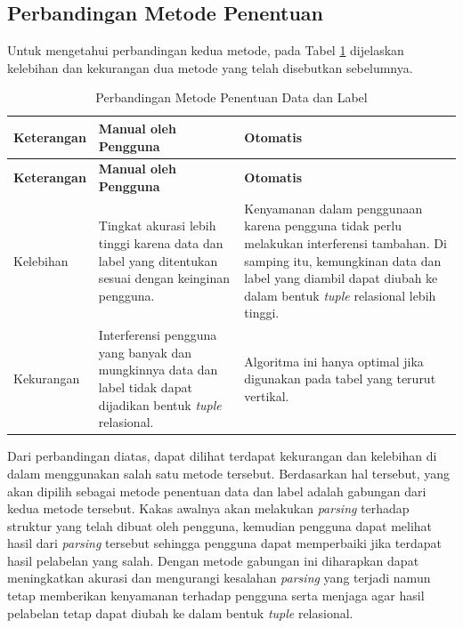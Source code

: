 	\subsection{Perbandingan Metode Penentuan}
	Untuk mengetahui perbandingan kedua metode, pada Tabel \ref{MetodePenentuan} dijelaskan kelebihan dan kekurangan dua metode yang telah disebutkan sebelumnya.
	\begin{small}
	\begin{longtable}{ | p{3cm} | p{4cm} | p{4cm} | }
	    \caption{Perbandingan Metode Penentuan Data dan Label}
	    \label{MetodePenentuan}\\ \hline
	    \centering\bfseries{Keterangan} & \centering\bfseries{Manual oleh Pengguna} & \centering\bfseries{Otomatis} \tabularnewline \hline
	    \endfirsthead
	    \hline
	    \centering\bfseries{Keterangan} & \centering\bfseries{Manual oleh Pengguna} & \centering\bfseries{Otomatis} \tabularnewline \hline
	    \endhead
	    Kelebihan & Tingkat akurasi lebih tinggi karena data dan label yang ditentukan sesuai dengan keinginan pengguna. & Kenyamanan dalam penggunaan karena pengguna tidak perlu melakukan interferensi tambahan. Di samping itu, kemungkinan data dan label yang diambil dapat diubah ke dalam bentuk \textit{tuple} relasional lebih tinggi. \\ \hline
	    Kekurangan & Interferensi pengguna yang banyak dan mungkinnya data dan label tidak dapat dijadikan bentuk \textit{tuple} relasional. & Algoritma ini hanya optimal jika digunakan pada tabel yang terurut vertikal. \\ \hline
  	\end{longtable}
	\end{small}
  	Dari perbandingan diatas, dapat dilihat terdapat kekurangan dan kelebihan di dalam menggunakan salah satu metode tersebut. Berdasarkan hal tersebut, yang akan dipilih sebagai metode penentuan data dan label adalah gabungan dari kedua metode tersebut. Kakas awalnya akan melakukan \textit{parsing} terhadap struktur yang telah dibuat oleh pengguna, kemudian pengguna dapat melihat hasil dari \textit{parsing} tersebut sehingga pengguna dapat memperbaiki jika terdapat hasil pelabelan yang salah. Dengan metode gabungan ini diharapkan dapat meningkatkan akurasi dan mengurangi kesalahan \textit{parsing} yang terjadi namun tetap memberikan kenyamanan terhadap pengguna serta menjaga agar hasil pelabelan tetap dapat diubah ke dalam bentuk \textit{tuple} relasional.

